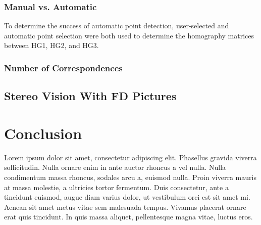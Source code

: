 \documentclass[a4paper, 10pt, conference]{ieeeconf}
\begin{document}
\subsubsection{Manual vs. Automatic}
To determine the success of automatic point detection, user-selected and automatic point selection were both used to determine the homography matrices between HG1, HG2, and HG3. 



\subsubsection{Number of Correspondences}



\subsection{Stereo Vision With FD Pictures}


\cite{notes}


\section{Conclusion}
Lorem ipsum dolor sit amet, consectetur adipiscing elit. Phasellus gravida viverra sollicitudin. Nulla ornare enim in ante auctor rhoncus a vel nulla. Nulla condimentum massa rhoncus, sodales arcu a, euismod nulla. Proin viverra mauris at massa molestie, a ultricies tortor fermentum. Duis consectetur, ante a tincidunt euismod, augue diam varius dolor, ut vestibulum orci est sit amet mi. Aenean sit amet metus vitae sem malesuada tempus. Vivamus placerat ornare erat quis tincidunt. In quis massa aliquet, pellentesque magna vitae, luctus eros.



\end{document}
